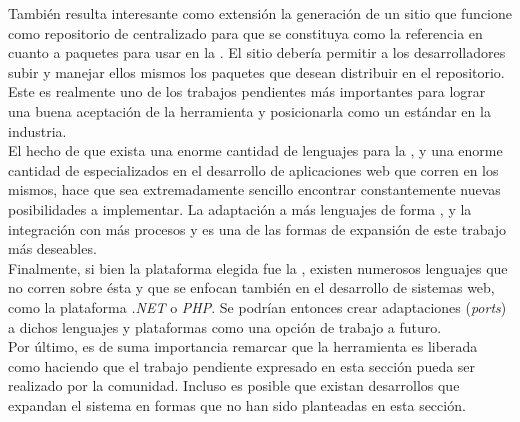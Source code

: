 También resulta interesante como extensión la generación de un sitio que 
funcione como repositorio de \dependencies centralizado para que se constituya 
como la referencia en cuanto a paquetes para usar en la \viewtier. El sitio 
debería permitir a los desarrolladores subir y manejar ellos mismos los 
paquetes que desean distribuir en el repositorio. Este es realmente uno de los 
trabajos pendientes más importantes para lograr una buena aceptación de la 
herramienta y posicionarla como un estándar en la industria.\\
El hecho de que exista una enorme cantidad de lenguajes para la \jvm, y una 
enorme cantidad de \frameworks especializados en el desarrollo de aplicaciones 
web que corren en los mismos, hace que sea extremadamente sencillo encontrar 
constantemente nuevas posibilidades a implementar. La adaptación a más 
lenguajes de forma , y la integración con más procesos y 
\frameworks es una de las formas de expansión de este trabajo más deseables.\\
Finalmente, si bien la plataforma elegida fue la \jvm,
existen numerosos lenguajes que no corren sobre ésta y que se enfocan también
en el desarrollo de sistemas web, como la plataforma \emph{.NET} o \emph{PHP}.
Se podrían entonces crear adaptaciones (\emph{ports}) a dichos lenguajes y
plataformas como una opción de trabajo a futuro.\\
Por último, es de suma importancia remarcar que la herramienta es liberada como
\freesoft haciendo que el trabajo pendiente expresado en esta sección pueda ser
realizado por la comunidad. Incluso es posible que existan desarrollos que 
expandan el sistema en formas que no han sido planteadas en esta sección.\\